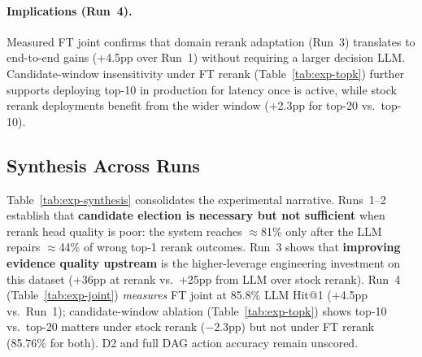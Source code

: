 \documentclass[sigconf,review]{acmart}
\newcommand{\code}[1]{\texttt{\seqsplit{#1}}}
\begin{document}
\begin{table}[t]
  \caption{Run~4 joint pipeline (Qwen3.5-27B decision). Row~1: measured FT joint; row~2: Run~1 stock anchor; row~3: stock joint script reference.}
  \label{tab:exp-joint}
  \centering
  \footnotesize
  \setlength{\tabcolsep}{3pt}
\end{table}

\paragraph{Implications (Run~4).}
Measured FT joint confirms that domain rerank adaptation (Run~3) translates to end-to-end gains (+4.5pp over Run~1) without requiring a larger decision LLM.
Candidate-window insensitivity under FT rerank (Table~\ref{tab:exp-topk}) further supports deploying top-10 in production for latency once \code{out\_bge\_rerank\_ft} is active, while stock rerank deployments benefit from the wider window ($+$2.3pp for top-20 vs.\ top-10).

\subsection{Synthesis Across Runs}
\label{sec:exp-synthesis}
Table~\ref{tab:exp-synthesis} consolidates the experimental narrative. Runs~1--2 establish that \textbf{candidate election is necessary but not sufficient} when rerank head quality is poor: the system reaches $\approx$81\% only after the LLM repairs $\approx$44\% of wrong top-1 rerank outcomes. Run~3 shows that \textbf{improving evidence quality upstream} is the higher-leverage engineering investment on this dataset (+36pp at rerank vs.\ +25pp from LLM over stock rerank). Run~4 (Table~\ref{tab:exp-joint}) \emph{measures} FT joint at 85.8\% LLM Hit@1 ($+$4.5pp vs.\ Run~1); candidate-window ablation (Table~\ref{tab:exp-topk}) shows top-10 vs.\ top-20 matters under stock rerank ($-$2.3pp) but not under FT rerank (85.76\% for both). D2 and full DAG action accuracy remain unscored.
\end{document}
